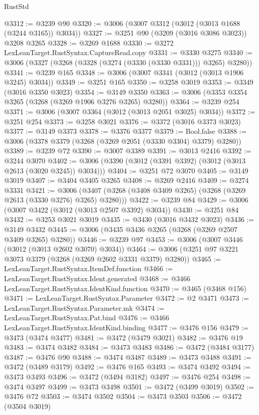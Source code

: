 \begin{lexlean}{RustStd}
\begin{coremodule}
@3312 := @3239 @90
@3320 := @3006 (@3007 @3312 (@3012 (@3013 @1688 (@3244 @3165)) @3034))
@3327 := @3251 @90 (@3209 (@3016 @3086 @3023)) @3208 @3265
@3328 := @3269 @1688
@3330 := @3272 LexLeanTarget.RustSyntax.CaptureRead.copy
@3331 := @3330 @3275
@3340 := @3006 (@3327 (@3268 (@3328 (@3274 (@3330 (@3330 @3331))) @3265) @3280))
@3341 := @3239 @165
@3348 := @3006 (@3007 @3341 (@3012 (@3013 @1906 @3245) @3034))
@3349 := @3251 @165
@3350 := @3258 @3019
@3353 := @3349 (@3016 @3350 @3023)
@3354 := @3149 @3350
@3363 := @3006 (@3353 @3354 @3265 (@3268 (@3269 @1906 @3276 @3265) @3280))
@3364 := @3239 @254
@3371 := @3006 (@3007 @3364 (@3012 (@3013 @2051 @3025) @3034))
@3372 := @3251 @254
@3373 := @3258 @3021
@3376 := @3372 (@3016 @3373 @3023)
@3377 := @3149 @3373
@3378 := @3376 @3377
@3379 := Bool.false
@3388 := @3006 (@3378 @3379 (@3268 (@3269 @2051 (@3330 @3304) @3379) @3280))
@3389 := @3239 @72
@3390 := @3007 @3389
@3391 := @3013 @2416
@3392 := @3244 @3070
@3402 := @3006 (@3390 (@3012 (@3391 @3392) (@3012 (@3013 @2613 (@3020 @3245)) @3034)))
@3404 := @3251 @72 @3070
@3405 := @3149 @3019
@3407 := @3404 @3405 @3265
@3408 := @3269 @2416
@3409 := @3274 @3331
@3421 := @3006 (@3407 (@3268 (@3408 @3409 @3265) (@3268 (@3269 @2613 (@3330 @3276) @3265) @3280)))
@3422 := @3239 @84
@3429 := @3006 (@3007 @3422 (@3012 (@3013 @2507 @3392) @3034))
@3430 := @3251 @84
@3432 := @3253 @3021 @3019
@3435 := @3430 (@3016 @3432 @3023)
@3436 := @3149 @3432
@3445 := @3006 (@3435 @3436 @3265 (@3268 (@3269 @2507 @3409 @3265) @3280))
@3446 := @3239 @97
@3453 := @3006 (@3007 @3446 (@3012 (@3013 @2602 @3070) @3034))
@3464 := @3006 (@3251 @97 @3221 @3073 @3379 (@3268 (@3269 @2602 @3331 @3379) @3280))
@3465 := LexLeanTarget.RustSyntax.ItemDef.function
@3466 := LexLeanTarget.RustSyntax.Ident.generated
@3468 := @3466 LexLeanTarget.RustSyntax.IdentKind.function
@3470 := @3465 (@3468 @156)
@3471 := LexLeanTarget.RustSyntax.Parameter
@3472 := @2 @3471
@3473 := LexLeanTarget.RustSyntax.Parameter.mk
@3474 := LexLeanTarget.RustSyntax.Pat.bind
@3476 := @3466 LexLeanTarget.RustSyntax.IdentKind.binding
@3477 := @3476 @156
@3479 := @3473 (@3474 @3477)
@3481 := @3472 (@3479 @3021)
@3482 := @3476 @19
@3483 := @3474 @3482
@3484 := @3473 @3483
@3486 := @3472 (@3484 @3177)
@3487 := @3476 @90
@3488 := @3474 @3487
@3489 := @3473 @3488
@3491 := @3472 (@3489 @3179)
@3492 := @3476 @165
@3493 := @3474 @3492
@3494 := @3473 @3493
@3496 := @3472 (@3494 @3182)
@3497 := @3476 @254
@3498 := @3474 @3497
@3499 := @3473 @3498
@3501 := @3472 (@3499 @3019)
@3502 := @3476 @72
@3503 := @3474 @3502
@3504 := @3473 @3503
@3506 := @3472 (@3504 @3019)

\end{coremodule}
\end{lexlean}
